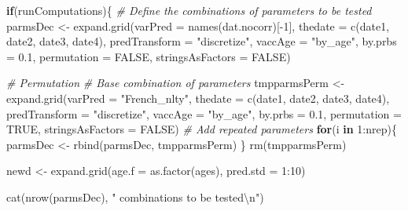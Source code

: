 \documentclass[
]{article}
\newenvironment{Shaded}{\begin{snugshade}}{\end{snugshade}}
\newcommand{\AttributeTok}[1]{\textcolor[rgb]{0.77,0.63,0.00}{#1}}
\newcommand{\CommentTok}[1]{\textcolor[rgb]{0.56,0.35,0.01}{\textit{#1}}}
\newcommand{\ConstantTok}[1]{\textcolor[rgb]{0.00,0.00,0.00}{#1}}
\newcommand{\ControlFlowTok}[1]{\textcolor[rgb]{0.13,0.29,0.53}{\textbf{#1}}}
\newcommand{\DecValTok}[1]{\textcolor[rgb]{0.00,0.00,0.81}{#1}}
\newcommand{\FloatTok}[1]{\textcolor[rgb]{0.00,0.00,0.81}{#1}}
\newcommand{\FunctionTok}[1]{\textcolor[rgb]{0.00,0.00,0.00}{#1}}
\newcommand{\NormalTok}[1]{#1}
\newcommand{\OtherTok}[1]{\textcolor[rgb]{0.56,0.35,0.01}{#1}}
\newcommand{\SpecialCharTok}[1]{\textcolor[rgb]{0.00,0.00,0.00}{#1}}
\newcommand{\StringTok}[1]{\textcolor[rgb]{0.31,0.60,0.02}{#1}}
\begin{document}
\begin{Shaded}
\begin{Highlighting}[]
\ControlFlowTok{if}\NormalTok{(runComputations)\{}
  \CommentTok{\# Define the combinations of parameters to be tested}
\NormalTok{  parmsDec }\OtherTok{\textless{}{-}} \FunctionTok{expand.grid}\NormalTok{(}\AttributeTok{varPred =} \FunctionTok{names}\NormalTok{(dat.nocorr)[}\SpecialCharTok{{-}}\DecValTok{1}\NormalTok{], }
                          \AttributeTok{thedate =} \FunctionTok{c}\NormalTok{(date1, date2, date3, date4), }
                          \AttributeTok{predTransform =} \StringTok{"discretize"}\NormalTok{, }
                          \AttributeTok{vaccAge =} \StringTok{"by\_age"}\NormalTok{, }
                          \AttributeTok{by.prbs =} \FloatTok{0.1}\NormalTok{, }
                          \AttributeTok{permutation =} \ConstantTok{FALSE}\NormalTok{,}
                          \AttributeTok{stringsAsFactors =} \ConstantTok{FALSE}\NormalTok{)}
  
  \CommentTok{\# Permutation}
  \CommentTok{\# Base combination of parameters}
\NormalTok{  tmpparmsPerm }\OtherTok{\textless{}{-}} \FunctionTok{expand.grid}\NormalTok{(}\AttributeTok{varPred =} \StringTok{"French\_nlty"}\NormalTok{, }
                              \AttributeTok{thedate =} \FunctionTok{c}\NormalTok{(date1, date2, date3, date4), }
                              \AttributeTok{predTransform =} \StringTok{"discretize"}\NormalTok{, }
                              \AttributeTok{vaccAge =} \StringTok{"by\_age"}\NormalTok{, }
                              \AttributeTok{by.prbs =} \FloatTok{0.1}\NormalTok{, }
                              \AttributeTok{permutation =} \ConstantTok{TRUE}\NormalTok{,}
                              \AttributeTok{stringsAsFactors =} \ConstantTok{FALSE}\NormalTok{)}
  \CommentTok{\# Add repeated parameters}
  \ControlFlowTok{for}\NormalTok{(i }\ControlFlowTok{in} \DecValTok{1}\SpecialCharTok{:}\NormalTok{nrep)\{}
\NormalTok{    parmsDec }\OtherTok{\textless{}{-}} \FunctionTok{rbind}\NormalTok{(parmsDec, tmpparmsPerm)}
\NormalTok{  \}}
  \FunctionTok{rm}\NormalTok{(tmpparmsPerm)}
  
  
\NormalTok{  newd }\OtherTok{\textless{}{-}} \FunctionTok{expand.grid}\NormalTok{(}\AttributeTok{age.f =} \FunctionTok{as.factor}\NormalTok{(ages), }\AttributeTok{pred.std =} \DecValTok{1}\SpecialCharTok{:}\DecValTok{10}\NormalTok{)}
  
  
  \FunctionTok{cat}\NormalTok{(}\FunctionTok{nrow}\NormalTok{(parmsDec), }\StringTok{" combinations to be tested}\SpecialCharTok{\textbackslash{}n}\StringTok{"}\NormalTok{)}
  

\end{Highlighting}
\end{Shaded}
\end{document}
